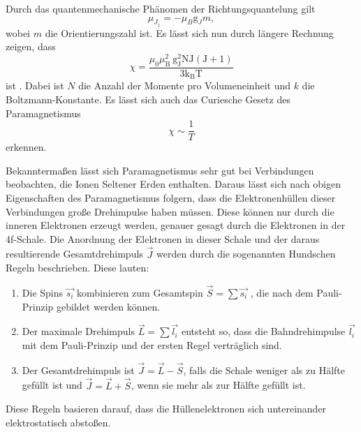 Durch das quantenmechanische Phänomen der Richtungsquantelung gilt
\begin{equation*}
    \mu_{J_z} = - \mu_B \text{g}_J m,
\end{equation*}
wobei $m$ die Orientierungszahl ist.
Es lässt sich nun durch längere Rechnung zeigen, dass
\begin{equation}\label{eq:susz_theo}
    \chi=\frac{\mu_{0} \mu_{\mathrm{B}}^{2} \mathrm{~g}_{\mathrm{J}}^{2} \mathrm{NJ}(\mathrm{J}+1)}{3 \mathrm{k_B T}}
\end{equation}
ist \cite{v606}.
Dabei ist $N$ die Anzahl der Momente pro Volumeneinheit und $k$ die Boltzmann-Konstante.
Es lässt sich auch das Curiesche Gesetz des Paramagnetismus
\begin{equation}
    \chi \sim \frac{1}{T}
\end{equation}
erkennen.

Bekanntermaßen lässt sich Paramagnetismus sehr gut bei Verbindungen beobachten, die Ionen Seltener Erden enthalten.
Daraus lässt sich nach obigen Eigenschaften des Paramagnetismus folgern, dass die Elektronenhüllen dieser Verbindungen große Drehimpulse haben müssen.
Diese können nur durch die inneren Elektronen erzeugt werden, genauer gesagt durch die Elektronen in der 4f-Schale.
Die Anordnung der Elektronen in dieser Schale und der daraus resultierende Gesamtdrehimpuls $\vec{J}$ werden durch die sogenannten Hundschen Regeln beschrieben.
Diese lauten:
\begin{enumerate}
    \item Die Spins $\vec{s_i}$ kombinieren zum Gesamtspin $\vec{S} = \sum \vec{s_i}$ , die nach dem Pauli-Prinzip gebildet werden können.
    \item Der maximale Drehimpuls $\vec{L} = \sum \vec{l_i}$ entsteht so, dass die Bahndrehimpulse $\vec{l_i}$ mit dem Pauli-Prinzip und der ersten Regel verträglich sind.
    \item Der Gesamtdrehimpuls ist $\vec{J} = \vec{L} - \vec{S}$, falls die Schale weniger als zu Hälfte gefüllt ist und $\vec{J} = \vec{L} + \vec{S}$, wenn sie mehr als zur Hälfte gefüllt ist.
\end{enumerate}

Diese Regeln basieren darauf, dass die Hüllenelektronen sich untereinander elektrostatisch abstoßen.



